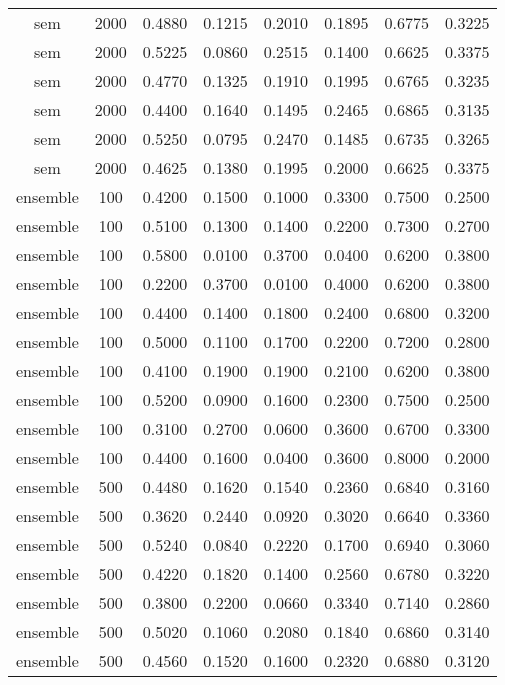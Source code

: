 \begin{scriptsize}
\begin{longtable}{cccccccc}
		sem      & 2000 & 0.4880 & 0.1215 & 0.2010 & 0.1895 & 0.6775 & 0.3225 \\
		sem      & 2000 & 0.5225 & 0.0860 & 0.2515 & 0.1400 & 0.6625 & 0.3375 \\
		sem      & 2000 & 0.4770 & 0.1325 & 0.1910 & 0.1995 & 0.6765 & 0.3235 \\
		sem      & 2000 & 0.4400 & 0.1640 & 0.1495 & 0.2465 & 0.6865 & 0.3135 \\
		sem      & 2000 & 0.5250 & 0.0795 & 0.2470 & 0.1485 & 0.6735 & 0.3265 \\
		sem      & 2000 & 0.4625 & 0.1380 & 0.1995 & 0.2000 & 0.6625 & 0.3375 \\
		ensemble & 100  & 0.4200 & 0.1500 & 0.1000 & 0.3300 & 0.7500 & 0.2500 \\
		ensemble & 100  & 0.5100 & 0.1300 & 0.1400 & 0.2200 & 0.7300 & 0.2700 \\
		ensemble & 100  & 0.5800 & 0.0100 & 0.3700 & 0.0400 & 0.6200 & 0.3800 \\
		ensemble & 100  & 0.2200 & 0.3700 & 0.0100 & 0.4000 & 0.6200 & 0.3800 \\
		ensemble & 100  & 0.4400 & 0.1400 & 0.1800 & 0.2400 & 0.6800 & 0.3200 \\
		ensemble & 100  & 0.5000 & 0.1100 & 0.1700 & 0.2200 & 0.7200 & 0.2800 \\
		ensemble & 100  & 0.4100 & 0.1900 & 0.1900 & 0.2100 & 0.6200 & 0.3800 \\
		ensemble & 100  & 0.5200 & 0.0900 & 0.1600 & 0.2300 & 0.7500 & 0.2500 \\
		ensemble & 100  & 0.3100 & 0.2700 & 0.0600 & 0.3600 & 0.6700 & 0.3300 \\
		ensemble & 100  & 0.4400 & 0.1600 & 0.0400 & 0.3600 & 0.8000 & 0.2000 \\
		ensemble & 500  & 0.4480 & 0.1620 & 0.1540 & 0.2360 & 0.6840 & 0.3160 \\
		ensemble & 500  & 0.3620 & 0.2440 & 0.0920 & 0.3020 & 0.6640 & 0.3360 \\
		ensemble & 500  & 0.5240 & 0.0840 & 0.2220 & 0.1700 & 0.6940 & 0.3060 \\
		ensemble & 500  & 0.4220 & 0.1820 & 0.1400 & 0.2560 & 0.6780 & 0.3220 \\
		ensemble & 500  & 0.3800 & 0.2200 & 0.0660 & 0.3340 & 0.7140 & 0.2860 \\
		ensemble & 500  & 0.5020 & 0.1060 & 0.2080 & 0.1840 & 0.6860 & 0.3140 \\
		ensemble & 500  & 0.4560 & 0.1520 & 0.1600 & 0.2320 & 0.6880 & 0.3120 \\

\end{longtable}
\end{scriptsize}
